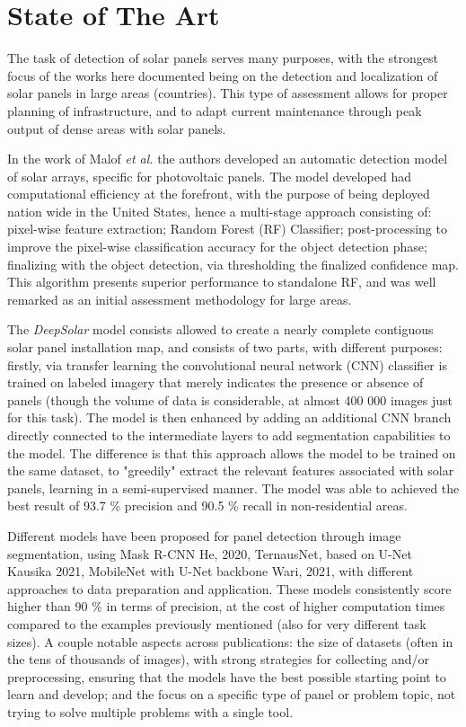 \documentclass[conference]{IEEEtran}
\begin{document}

\section{State of The Art}

The task of detection of solar panels serves many purposes, with the strongest focus of the works here documented being on the detection and localization of solar panels in large areas (countries). This type of assessment allows for proper planning of infrastructure, and to adapt current maintenance through peak output of dense areas with solar panels.

In the work of Malof \textit{et al.} the authors developed an automatic detection model of solar arrays, specific for photovoltaic panels. The model developed had computational efficiency at the forefront, with the purpose of being deployed nation wide in the United States, hence a multi-stage approach consisting of: pixel-wise feature extraction; Random Forest (RF) Classifier; post-processing to improve the pixel-wise classification accuracy for the object detection phase; finalizing with the object detection, via thresholding the finalized confidence map. This algorithm presents superior performance to standalone RF, and was well remarked as an initial assessment methodology for large areas. 

The \textit{DeepSolar} model consists allowed to create a nearly complete contiguous solar panel installation map, and consists of two parts, with different purposes: firstly, via transfer learning the convolutional neural network (CNN) classifier is trained on labeled imagery that merely indicates the presence or absence of panels (though the volume of data is considerable, at almost 400 000 images just for this task). The model is then enhanced by adding an additional CNN branch directly connected to the intermediate layers to add segmentation capabilities to the model. The difference is that this approach allows the model to be trained on the same dataset, to "greedily" extract the relevant features associated with solar panels, learning in a semi-supervised manner. The model was able to achieved the best result of 93.7 \% precision and 90.5 \% recall in non-residential areas.

Different models have been proposed for panel detection through image segmentation, using Mask R-CNN {He, 2020}, TernausNet, based on U-Net {Kausika 2021}, MobileNet with U-Net backbone {Wari, 2021}, with different approaches to data preparation and application. These models consistently score higher than 90 \% in terms of precision, at the cost of higher computation times compared to the examples previously mentioned (also for very different task sizes). A couple notable aspects across publications: the size of datasets (often in the tens of thousands of images), with strong strategies for collecting and/or preprocessing, ensuring that the models have the best possible starting point to learn and develop; and the focus on a specific type of panel or problem topic, not trying to solve multiple problems with a single tool.
\end{document}
